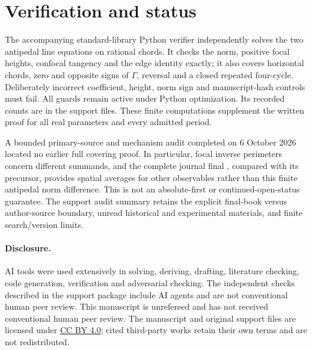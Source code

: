 \documentclass[10pt]{article}
\begin{document}
\section{Verification and status}
The accompanying standard-library Python verifier independently solves
the two antipedal line equations on rational chords. It checks the norm,
positive focal heights, confocal tangency and the edge identity exactly;
it also covers horizontal chords, zero and opposite signs of $\Gamma$,
reversal and a closed repeated four-cycle. Deliberately incorrect
coefficient, height, norm sign and manuscript-hash controls must fail.
All guards remain active under Python optimization. Its recorded counts
are in the support files. These finite computations supplement the
written proof for all real parameters and every admitted period.

A bounded primary-source and mechanism audit completed on 6 October 2026
located no earlier full covering proof. In particular, focal inverse
perimeters \cite{RGR} concern different summands, and the complete
journal final \cite{GKR}, compared with its precursor, provides spatial
averages for other observables rather than this finite antipedal norm
difference. This is not an absolute-first or continued-open-status
guarantee. The support audit summary retains the explicit final-book
versus author-source boundary, unread historical and experimental
materials, and finite search/version limits.

\paragraph{Disclosure.}
AI tools were used extensively in solving, deriving, drafting, literature
checking, code generation, verification and adversarial checking.
The independent checks described in the support package include AI
agents and are not conventional human peer review. This manuscript is
unrefereed and has not received conventional human peer review.
The manuscript and original support files are licensed under
\href{https://creativecommons.org/licenses/by/4.0/}{CC BY 4.0}; cited
third-party works retain their own terms and are not redistributed.
\end{document}
